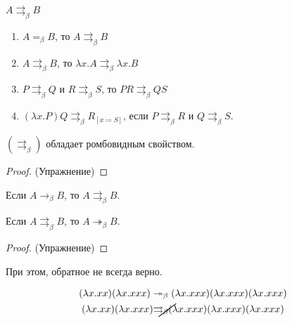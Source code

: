 \begin{definition}
    $A \rightrightarrows_{\beta} B$
    \begin{enumerate}
        \item $A =_{\beta} B$, то $A \rightrightarrows_{\beta}B$
        \item $A \rightrightarrows_{\beta} B$, то $\lambda x.A \rightrightarrows_{\beta} \lambda x . B$
        \item $P \rightrightarrows_{\beta} Q$ и $R \rightrightarrows_{\beta} S$, то $PR \rightrightarrows_{\beta} QS$
        \item $(\lambda x . P) Q \rightrightarrows_{\beta} R_{[x\coloneqq{}S]}$, если 
            $P \rightrightarrows_{\beta}R$ и $Q \rightrightarrows_{\beta} S$.
    \end{enumerate}
\end{definition}

\begin{statement} \label{st-star}
    $(\rightrightarrows_{\beta})$ обладает ромбовидным свойством.
\end{statement}

\begin{proof}
    (Упражнение) \todo %
\end{proof}

\begin{statement} \label{st-A}
    Если $A \rightarrow_{\beta} B$, то $A \rightrightarrows_{\beta} B$.
\end{statement}

\begin{statement} \label{st-B}
    Если $A \rightrightarrows_{\beta} B$, то $A \twoheadrightarrow_{\beta} B$.
\end{statement}

\begin{proof}
    (Упражнение) \todo %
\end{proof}

При этом, обратное не всегда верно.

\begin{example}
    \begin{gather*}
        (\lambda x . x x) (\lambda x . x x x) \twoheadrightarrow_{\beta} (\lambda x . x x x)(\lambda x . x x x)(\lambda x . x x x) \\
        (\lambda x . x x) (\lambda x . x x x) \cancel{\rightrightarrows_{\beta}} (\lambda x . x x x)(\lambda x . x x x)(\lambda x . x x x)
    \end{gather*}
\end{example}

